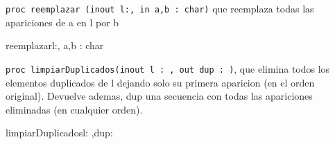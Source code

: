 \documentclass[10pt,a4paper]{article}
\begin{document}
\salto{\baselineskip}
\texttt{proc reemplazar (inout l:, in a,b : char)} que reemplaza todas las apariciones de a en l por b
{\color{red}\begin{proc}{reemplazar}{\Inout l:, \In a,b : char}{}
\end{proc}}
    \salto{\baselineskip}
\pagebreak
\texttt{proc limpiarDuplicados(inout l : , out dup : )}, que elimina todos los elementos duplicados de l dejando solo su primera aparicion (en el orden original). Devuelve ademas, dup una secuencia con todas las apariciones eliminadas (en cualquier orden).
{\color{red}\begin{proc}{limpiarDuplicados}{\Inout l: ,\Out dup: }{}
    \requiere{\True}
\end{proc}
}
    
\end{document}
